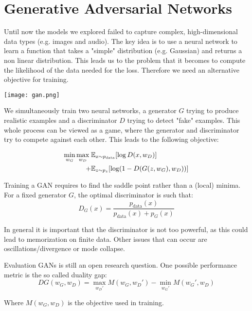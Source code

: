 \section{Generative Adversarial Networks}

Until now the models we explored failed to capture complex, high-dimensional data types (e.g. images and audio). The key idea is to use a neural network to learn a function that takes a "simple" distribution (e.g. Gaussian) and returns a non linear distribution. This leads us to the problem that it becomes to compute the likelihood of the data needed for the loss. Therefore we need an alternative objective for training.

\texttt{[image: gan.png]}

We simultaneously train two neural networks, a generator $G$ trying to produce realistic examples and a discriminator $D$ trying to detect "fake" examples. This whole process can be viewed as a game, where the generator and discriminator try to compete against each other. This leads to the following objective:

\begin{align*}
	\min_{w_G} \max_{w_D} \; & \mathbb{E}_{x \sim p_{\text{data}}} [\log D(x, w_D)] \\
 	+ &\mathbb{E}_{z \sim p_z} [\log (1 - D(G(z, w_G), w_D))]
 \end{align*}
 
 Training a GAN requires to find the saddle point rather than a (local) minima. For a fixed generator $G$, the optimal discriminator is such that:
 $$D_G(x) = \frac{p_{\text{data}}(x)}{p_{\text{data}}(x) + p_G(x)}$$
 
 In general it is important that the discriminator is not too powerful, as this could lead to memorization on finite data. Other issues that can occur are oscillations/divergence or mode collapse. \medskip
 
 Evaluation GANs is still an open research question. One possible performance metric is the so called duality gap:
 $$DG(w_G, w_D) = \max_{w_D'} M(w_G, w_D') - \min_{w_G'} M(w_G', w_D)$$
 
 Where $M(w_G, w_D)$ is the objective used in training.
 